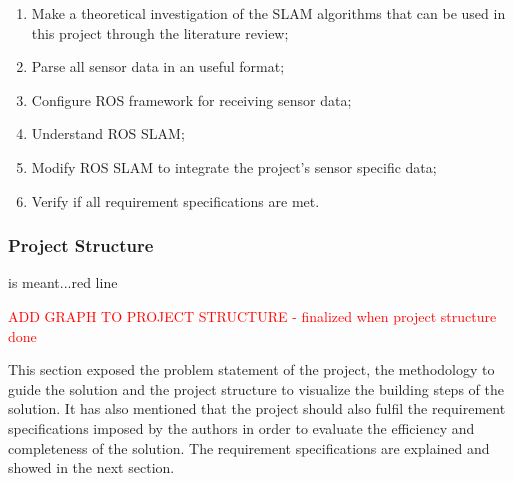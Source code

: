 \begin{enumerate}
    \item Make a theoretical investigation of the SLAM algorithms that can be used in this project through the literature review;
    \item Parse all sensor data in an useful format;
    \item Configure ROS framework for receiving sensor data;
    \item Understand ROS SLAM;
    \item Modify ROS SLAM to integrate the project's sensor specific data;
    \item Verify if all requirement specifications are met.
\end{enumerate}




\subsubsection{Project Structure}

is meant...red line

\textcolor{red}{ADD GRAPH TO PROJECT STRUCTURE - finalized when project structure done}

This section exposed the problem statement of the project, the methodology to guide the solution and the project structure to visualize the building steps of the solution. It has also mentioned that the project should also fulfil the requirement specifications imposed by the authors in order to evaluate the efficiency and completeness of the solution. The requirement specifications are explained and showed in the next section.